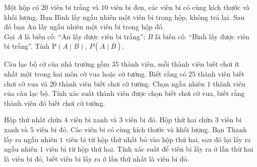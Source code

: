 \begin{vd}%
	Một hộp có $20$ viên bi trắng và $10$ viên bi đen, các viên bi có cùng kích thước và khối lượng. Bạn Bình lấy ngẫu nhiên một viên bi trong hộp, không trả lại. Sau đó bạn An lấy ngẫu nhiên một viên bi trong hộp đó.\\
	Gọi $A$ là biến cố: ``An lấy được viên bi trắng''; $B$ là biến cố: ``Bình lấy được viên bi trắng''. Tính $\mathrm{P}(A\mid B)$, $P\left(A\mid\overline{B}\right)$.
\end{vd}
\begin{vd}%
	Câu lạc bộ cờ của nhà trường gồm $35$ thành viên, mỗi thành viên biết chơi ít nhất một trong hai môn cờ vua hoặc cờ tướng. Biết rằng có $25$ thành viên biết chơi cờ vua và $20$ thành viên biết chơi cờ tướng. Chọn ngẫu nhiên $1$ thành viên của câu lạc bộ. Tính xác suất thành viên được chọn biết chơi cờ vua, biết rằng thành viên đó biết chơi cờ tướng.
\end{vd}
\begin{vd}%
	Hộp thứ nhất chứa $4$ viên bi xanh và $3$ viên bi đỏ. Hộp thứ hai chứa $3$ viên bi xanh và $5$ viên bi đỏ. Các viên bi có cùng kích thước và khối lượng. Bạn Thanh lấy ra ngẫu nhiên $1$ viên bi từ hộp thứ nhất bỏ vào hộp thứ hai, sau đó lại lấy ra ngẫu nhiên $1$ viên bi từ hộp thứ hai. Tính xác suất để viên bi lấy ra ở lần thứ hai là viên bi đỏ, biết viên bi lấy ra ở lần thứ nhất là viên bi đỏ.
\end{vd}
